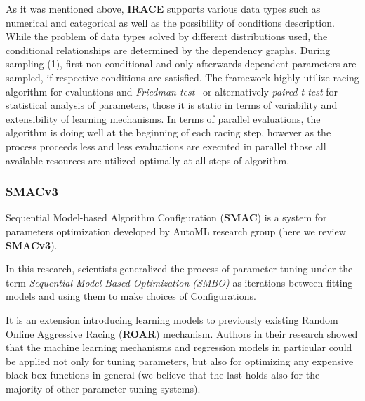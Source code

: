 As it was mentioned above, \textbf{IRACE} supports various data types such as numerical and categorical as well as the possibility of conditions description. While the problem of data types solved by different distributions used, the conditional relationships are determined by the dependency graphs. During sampling (1), first non-conditional and only afterwards dependent parameters are sampled, if respective conditions are satisfied. The framework highly utilize racing algorithm for evaluations and \textit{Friedman test}~\cite{conover1980practical} or alternatively \textit{paired t-test} for statistical analysis of parameters, those it is static in terms of variability and extensibility of learning mechanisms. In terms of parallel evaluations, the algorithm is doing well at the beginning of each racing step, however as the process proceeds less and less evaluations are executed in parallel those all available resources are utilized optimally at all steps of algorithm.


\subsubsection{SMACv3~\cite{hutter2011sequential}}\label{bg: smac}
Sequential Model-based Algorithm Configuration (\textbf{SMAC}) is a system for parameters optimization developed by AutoML research group (here we review \textbf{SMACv3}). 

In this research, scientists generalized the process of parameter tuning under the term \textit{Sequential Model-Based Optimization (SMBO)} as iterations between fitting models and using them to make choices of Configurations.

It is an extension introducing learning models to previously existing Random Online Aggressive Racing (\textbf{ROAR}) mechanism. Authors in their research showed that the machine learning mechanisms and regression models in particular could be applied not only for tuning parameters, but also for optimizing any expensive black-box functions in general (we believe that the last holds also for the majority of other parameter tuning systems). 

